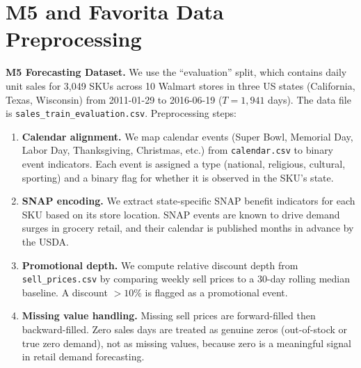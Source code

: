 \documentclass[10pt]{article} %
\theoremstyle{plain}
\theoremstyle{definition}
\begin{document}
\section{M5 and Favorita Data Preprocessing}
\label{app:preprocessing}

\textbf{M5 Forecasting Dataset.} We use the ``evaluation'' split, which contains daily unit sales for 3,049 SKUs across 10 Walmart stores in three US states (California, Texas, Wisconsin) from 2011-01-29 to 2016-06-19 ($T = 1{,}941$ days). The data file is \texttt{sales\_train\_evaluation.csv}. Preprocessing steps:
\begin{enumerate}
\item \textbf{Calendar alignment.} We map calendar events (Super Bowl, Memorial Day, Labor Day, Thanksgiving, Christmas, etc.) from \texttt{calendar.csv} to binary event indicators. Each event is assigned a type (national, religious, cultural, sporting) and a binary flag for whether it is observed in the SKU's state.
\item \textbf{SNAP encoding.} We extract state-specific SNAP benefit indicators for each SKU based on its store location. SNAP events are known to drive demand surges in grocery retail, and their calendar is published months in advance by the USDA.
\item \textbf{Promotional depth.} We compute relative discount depth from \texttt{sell\_prices.csv} by comparing weekly sell prices to a 30-day rolling median baseline. A discount $> 10\%$ is flagged as a promotional event.
\item \textbf{Missing value handling.} Missing sell prices are forward-filled then backward-filled. Zero sales days are treated as genuine zeros (out-of-stock or true zero demand), not as missing values, because zero is a meaningful signal in retail demand forecasting.
\end{enumerate}
\end{document}
